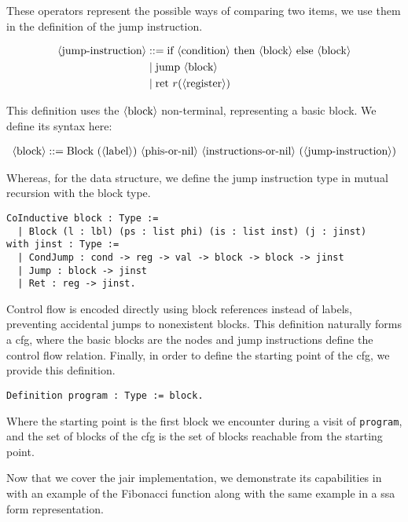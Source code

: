 These operators represent the possible ways of comparing two items, we use them in the definition of the jump instruction.

\begin{align*}
\langle\text{jump-instruction}\rangle &::= \text{if} \ \langle\text{condition}\rangle \ \text{then} \ \langle\text{block}\rangle \ \text{else} \ \langle\text{block}\rangle \\
&\mid \text{jump} \ \langle\text{block}\rangle \\
&\mid \text{ret} \ r( \langle\text{register}\rangle )
\end{align*}

This definition uses the $\langle\text{block}\rangle$ non-terminal, representing a basic block. We define its syntax here:

\begin{align*}
\nt{block} ::= \text{Block} \ ( \nt{label} ) \ \nt{phis-or-nil} \ \nt{instructions-or-nil} \ ( \nt{jump-instruction} )
\end{align*}

Whereas, for the data structure, we define the jump instruction type in mutual recursion with the block type.

\begin{lstlisting}[style=Rocq]
CoInductive block : Type :=
  | Block (l : lbl) (ps : list phi) (is : list inst) (j : jinst)
with jinst : Type :=
  | CondJump : cond -> reg -> val -> block -> block -> jinst
  | Jump : block -> jinst
  | Ret : reg -> jinst.
\end{lstlisting}

Control flow is encoded directly using block references instead of labels, preventing accidental jumps to nonexistent blocks. This definition naturally forms a \gls{cfg}, where the basic blocks are the nodes and jump instructions define the control flow relation. Finally, in order to define the starting point of the \gls{cfg}, we provide this definition.

\begin{lstlisting}[style=Rocq]
Definition program : Type := block.
\end{lstlisting}

Where the starting point is the first block we encounter during a visit of \texttt{program}, and the set of blocks of the \gls{cfg} is the set of blocks reachable from the starting point.

Now that we cover the \gls{jair} implementation, we demonstrate its capabilities in  with an example of the Fibonacci function along with the same example in a \gls{ssa} form representation.


